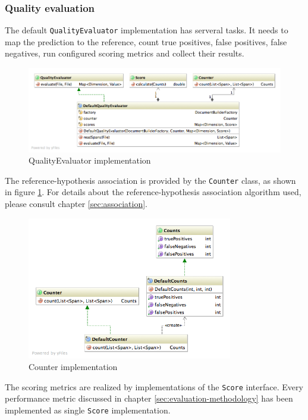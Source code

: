 \newpage
\subsubsection{Quality evaluation}
The default \texttt{QualityEvaluator} implementation has serveral tasks. It needs to map the prediction to the reference, count true positives, false positives, false negatives, run configured scoring metrics and collect their results.

\begin{figure}[H]
\centering
\includegraphics[width=\textwidth, trim=20px 20px 0 0, clip=true]{quality-evaluation.png}
\caption{QualityEvaluator implementation}
\end{figure}

The reference-hypothesis association is provided by the \texttt{Counter} class, as shown in figure \ref{fig:counter}. For details about the reference-hypothesis association algorithm used, please consult chapter \ref{sec:association}.

\begin{figure}[H]
\centering
\includegraphics[width=0.8\textwidth, trim=20px 20px 0 0, clip=true]{counter.png}
\caption{Counter implementation}
\label{fig:counter}
\end{figure}

The scoring metrics are realized by implementations of the \texttt{Score} interface. Every performance metric discussed in chapter \ref{sec:evaluation-methodology} has been implemented as single \texttt{Score} implementation.

